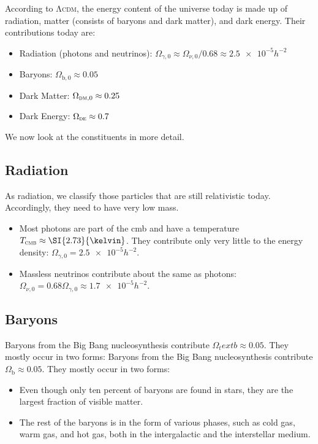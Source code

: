 According to \textsc{Λcdm}, the energy content of the universe today is made up of radiation, matter (consists of baryons and dark matter), and dark energy.
Their contributions today are:
\begin{itemize}[noitemsep, nolistsep]
	\item Radiation (photons and neutrinos): $\Omega_{\gamma,0} \approx \Omega_{\nu,0}/0.68 \approx \num{2.5e-5} h^{-2}$
	\item Baryons: $\Omega_{\text{b},0} \approx 0.05$
	\item Dark Matter: $\Omega_{\textsc{dm},0} \approx 0.25$
	\item Dark Energy: $\Omega_\textsc{de} \approx 0.7$
\end{itemize}
We now look at the constituents in more detail.

\subsection*{Radiation}

As radiation, we classify those particles that are still relativistic today. Accordingly, they need to have very low mass.
\begin{itemize}
	\item Most photons are part of the \ac{cmb} and have a temperature $T_\textsc{cmb} \approx \SI{2.73}{\kelvin}$. They contribute only very little to the energy density: $\Omega_{\gamma,0} = \num{2.5e-5} h^{-2}$.
	\item Massless neutrinos contribute about the same as photons: $\Omega_{\nu,0} = 0.68 \Omega_{\gamma,0} \approx \num{1.7e-5} h^{-2}$.
\end{itemize}

\subsection*{Baryons}
Baryons from the Big Bang nucleosynthesis contribute $\Omega_text{b} \approx 0.05$. They mostly occur in two forms:
Baryons from the Big Bang nucleosynthesis contribute $\Omega_\text{b} \approx 0.05$. They mostly occur in two forms:
\begin{itemize}
	\item Even though only ten percent of baryons are found in stars, they are the largest fraction of visible matter.
	\item The rest of the baryons is in the form of various phases, such as cold gas, warm gas, and hot gas, both in the intergalactic and the interstellar medium.
\end{itemize}

